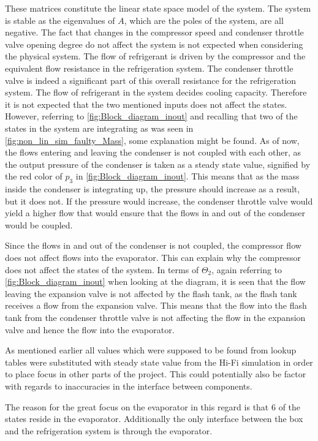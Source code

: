 These matrices constitute the linear state space model of the system. The system is stable as the eigenvalues of $A$, which are the poles of the system, are all negative.
The fact that changes in the compressor speed and condenser throttle valve opening degree do not affect the system is not expected when considering the physical system. The flow of refrigerant is driven by the compressor and the equivalent flow resistance in the refrigeration system. The condenser throttle valve is indeed a significant part of this overall resistance for the refrigeration system.
The flow of refrigerant in the system decides cooling capacity. Therefore it is not expected that the two mentioned inputs does not affect the states. However, referring to \cref{fig:Block_diagram_inout} and recalling that two of the states in the system are integrating as was seen in \cref{fig:non_lin_sim_faulty_Mass}, some explanation might be found. As of now, the flows entering and leaving the condenser is not coupled with each other, as the output pressure of the condenser is taken as a steady state value, signified by the red color of $ p_3 $ in \cref{fig:Block_diagram_inout}. This means that as the mass inside the condenser is integrating up, the pressure should increase as a result, but it does not. If the pressure would increase, the condenser throttle valve would yield a higher flow that would ensure that the flows in and out of the condenser would be coupled.

Since the flows in and out of the condenser is not coupled, the compressor flow does not affect flows into the evaporator. This can explain why the compressor does not affect the states of the system.
In terms of $ \Theta_2 $, again referring to \cref{fig:Block_diagram_inout} when looking at the diagram, it is seen that the flow leaving the expansion valve is not affected by the flash tank, as the flash tank receives a flow from the expansion valve. This means that the flow into the flash tank from the condenser throttle valve is not affecting the flow in the expansion valve and hence the flow into the evaporator.

As mentioned earlier all values which were supposed to be found from lookup tables were substituted with steady state value from the Hi-Fi simulation in order to place focus in other parts of the project. This could potentially also be factor with regards to inaccuracies in the interface between components.

The reason for the great focus on the evaporator in this regard is that 6 of the states reside in the evaporator. Additionally the only interface between the box and the refrigeration system is through the evaporator.

